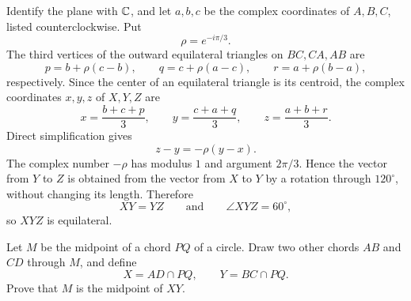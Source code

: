     \begin{solution}
        Identify the plane with $\mathbb{C}$, and let $a,b,c$ be the complex
        coordinates of $A,B,C$, listed counterclockwise. Put
        \[
            \rho=e^{-i\pi/3}.
        \]
        The third vertices of the outward equilateral triangles on
        $BC,CA,AB$ are
        \[
            p=b+\rho(c-b),
            \qquad
            q=c+\rho(a-c),
            \qquad
            r=a+\rho(b-a),
        \]
        respectively. Since the center of an equilateral triangle is its
        centroid, the complex coordinates $x,y,z$ of $X,Y,Z$ are
        \[
            x=\frac{b+c+p}{3},
            \qquad
            y=\frac{c+a+q}{3},
            \qquad
            z=\frac{a+b+r}{3}.
        \]
        Direct simplification gives
        \[
            z-y=-\rho(y-x).
        \]
        The complex number $-\rho$ has modulus $1$ and argument $2\pi/3$.
        Hence the vector from $Y$ to $Z$ is obtained from the vector from $X$
        to $Y$ by a rotation through $120^\circ$, without changing its length.
        Therefore
        \[
            XY=YZ
            \qquad\text{and}\qquad
            \angle XYZ=60^\circ,
        \]
        so $XYZ$ is equilateral.
    \end{solution}

    \begin{expectedproblem}
        Let $M$ be the midpoint of a chord $PQ$ of a circle. Draw two other
        chords $AB$ and $CD$ through $M$, and define
        \[
            X=AD\cap PQ,
            \qquad
            Y=BC\cap PQ.
        \]
        Prove that $M$ is the midpoint of $XY$.
    \end{expectedproblem}

